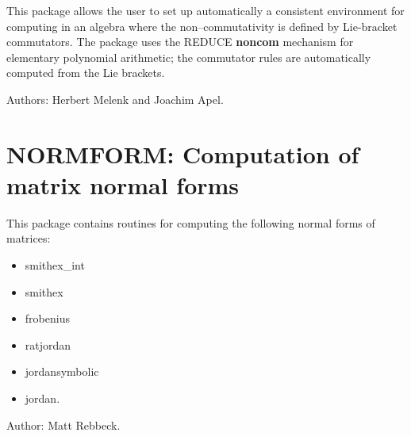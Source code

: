 This package allows the user to set up automatically a consistent
environment for computing in an algebra where the non--commutativity is
defined by Lie-bracket commutators.  The package uses the {REDUCE} {\bf
noncom} mechanism for elementary polynomial arithmetic; the commutator
rules are automatically computed from the Lie brackets.

Authors: Herbert Melenk and Joachim Apel.

\section{NORMFORM: Computation of matrix normal forms} 

This package contains routines for computing the following
normal forms of matrices:
\begin{itemize}
\item smithex\_int
\item smithex
\item frobenius
\item ratjordan
\item jordansymbolic
\item jordan.
\end{itemize}

Author: Matt Rebbeck.

